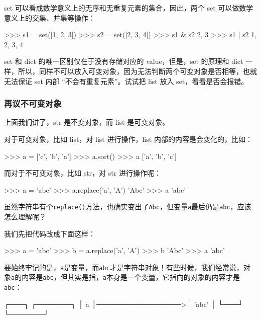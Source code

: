 set 可以看成数学意义上的无序和无重复元素的集合，因此，两个 set
可以做数学意义上的交集、并集等操作：

\begin{pythoncode}
>>> s1 = set([1, 2, 3])
>>> s2 = set([2, 3, 4])
>>> s1 & s2
{2, 3}
>>> s1 | s2
{1, 2, 3, 4}
\end{pythoncode}

set 和 dict 的唯一区别仅在于没有存储对应的 value，但是，set 的原理和
dict
一样，所以，同样不可以放入可变对象，因为无法判断两个可变对象是否相等，也就无法保证
set 内部 ``不会有重复元素''。试试把 list 放入 set，看看是否会报错。

\hypertarget{ux518dux8baeux4e0dux53efux53d8ux5bf9ux8c61}{%
\subsubsection{再议不可变对象}\label{ux518dux8baeux4e0dux53efux53d8ux5bf9ux8c61}}

上面我们讲了，str 是不变对象，而 list 是可变对象。

对于可变对象，比如 list，对 list 进行操作，list
内部的内容是会变化的，比如：

\begin{pythoncode}
>>> a = ['c', 'b', 'a']
>>> a.sort()
>>> a
['a', 'b', 'c']
\end{pythoncode}

而对于不可变对象，比如 str，对 str 进行操作呢：

\begin{pythoncode}
>>> a = 'abc'
>>> a.replace('a', 'A')
'Abc'
>>> a
'abc'
\end{pythoncode}

虽然字符串有个\texttt{replace()}方法，也确实变出了\texttt{\textquotesingle{}Abc\textquotesingle{}}，但变量\texttt{a}最后仍是\texttt{\textquotesingle{}abc\textquotesingle{}}，应该怎么理解呢？

我们先把代码改成下面这样：

\begin{pythoncode}
>>> a = 'abc'
>>> b = a.replace('a', 'A')
>>> b
'Abc'
>>> a
'abc'
\end{pythoncode}

要始终牢记的是，\texttt{a}是变量，而\texttt{\textquotesingle{}abc\textquotesingle{}}才是字符串对象！有些时候，我们经常说，对象\texttt{a}的内容是\texttt{\textquotesingle{}abc\textquotesingle{}}，但其实是指，\texttt{a}本身是一个变量，它指向的对象的内容才是\texttt{\textquotesingle{}abc\textquotesingle{}}：

\begin{pythoncode}
┌───┐                  ┌───────┐
│ a │─────────────────>│ 'abc' │
└───┘                  └───────┘
\end{pythoncode}


